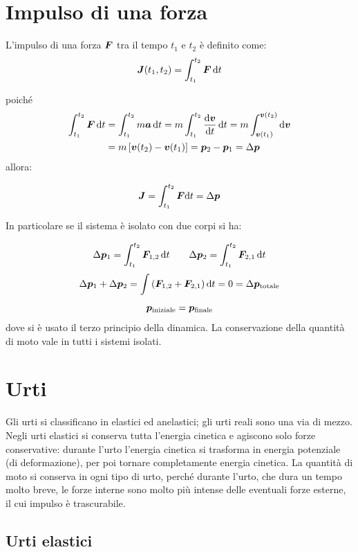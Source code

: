 \section{Impulso di una forza}
\begin{Def}
  L'impulso di una forza $\boldsymbol{F}$ tra il tempo $t_1$ e $t_2$ è definito come:
  \begin{equation}
    \boldsymbol{J}(t_1,t_2)=\int_{t_1}^{t_2} \boldsymbol{F}\, \mathrm{d} t
  \end{equation}
\end{Def}
poiché
\begin{align*}
  \int_{t_1}^{t_2} \boldsymbol{F}\, \mathrm{d} t & = \int_{t_1}^{t_2}m\boldsymbol{a}\, \mathrm{d} t=m\int_{t_1}^{t_2}\frac{\mathrm{d}\boldsymbol{v}}{\mathrm{d} t}\,\mathrm{d} t=m\int_{\boldsymbol{v}(t_1)}^{\boldsymbol{v}(t_2)}\mathrm{d} \boldsymbol{v} \\
                                  & =m\left[\boldsymbol{v}(t_2)-\boldsymbol{v}(t_1)\right]=\boldsymbol{p}_2 - \boldsymbol{p}_1=\Delta \boldsymbol{p}
\end{align*}
allora:
\begin{Teo}
  \[
    \boldsymbol{J}=\int_{t_1}^{t_2}\boldsymbol{F} \mathrm{d} t=\Delta \boldsymbol{p}
  \]
\end{Teo}
In particolare se il sistema è isolato con due corpi si ha:

\[
  \Delta \boldsymbol{p}_1=\int_{t_1}^{t_2} \boldsymbol{F}_{1,2}\, \mathrm{d} t\qquad \Delta \boldsymbol{p}_2=\int_{t_1}^{t_2} \boldsymbol{F}_{2,1}\, \mathrm{d} t
\]
\[
  \Delta \boldsymbol{p}_1 + \Delta \boldsymbol{p}_2=\int\left(\boldsymbol{F}_{1,2}+\boldsymbol{F}_{2,1}\right)\mathrm{d} t=0=\Delta\boldsymbol{p}_{\text{totale}}
\]
\[
  \boldsymbol{p}_{\text{iniziale}}=\boldsymbol{p}_{\text{finale}}
\]
dove si è usato il terzo principio della dinamica. La conservazione della quantità di moto vale in tutti i sistemi isolati.

\section{Urti}
Gli urti si classificano in elastici ed anelastici; gli urti reali sono una via di mezzo. Negli urti elastici si conserva tutta l'energia cinetica e agiscono solo forze conservative: durante l'urto l'energia cinetica si trasforma in energia potenziale (di deformazione), per poi tornare completamente energia cinetica. La quantità di moto si conserva in ogni tipo di urto, perché durante l'urto, che dura un tempo molto breve, le forze interne sono molto più intense delle eventuali forze esterne, il cui impulso è trascurabile.

\subsection{Urti elastici}

